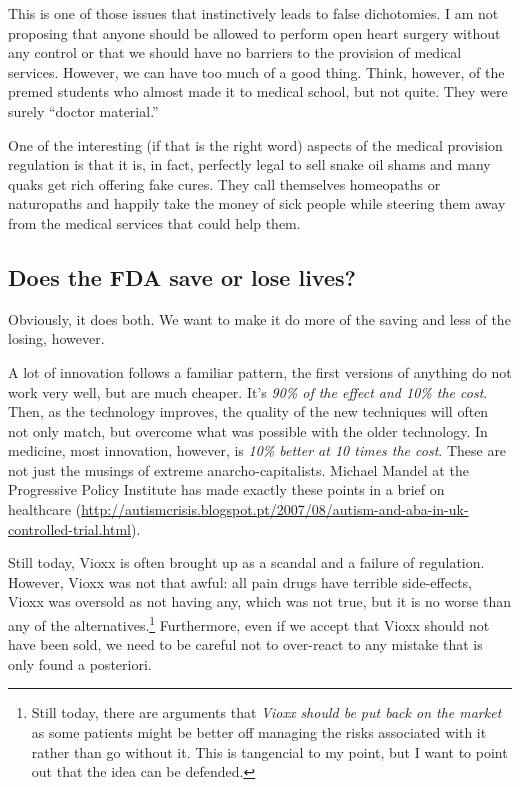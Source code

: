 This is one of those issues that instinctively leads to false dichotomies. I am
not proposing that anyone should be allowed to perform open heart surgery
without any control or that we should have no barriers to the provision of
medical services. However, we can have too much of a good thing. Think,
however, of the premed students who almost made it to medical school, but not
quite.  They were surely ``doctor material.''

One of the interesting (if that is the right word) aspects of the medical
provision regulation is that it is, in fact, perfectly legal to sell snake oil
shams and many quaks get rich offering fake cures. They call themselves
homeopaths or naturopaths and happily take the money of sick people while
steering them away from the medical services that could help them.

\subsection{Does the FDA save or lose lives?}

Obviously, it does both. We want to make it do more of the saving and less of
the losing, however.

A lot of innovation follows a familiar pattern, the first versions of anything
do not work very well, but are much cheaper. It's \emph{90\% of the effect and
10\% the cost}. Then, as the technology improves, the quality of the new
techniques will often not only match, but overcome what was possible with the
older technology. In medicine, most innovation, however, is \emph{10\% better
at 10 times the cost}. These are not just the musings of extreme
anarcho-capitalists. Michael Mandel at the Progressive Policy Institute has
made exactly these points in a brief on healthcare
(\url{http://autismcrisis.blogspot.pt/2007/08/autism-and-aba-in-uk-controlled-trial.html}).

Still today, Vioxx is often brought up as a scandal and a failure of
regulation. However, Vioxx was not that awful: all pain drugs have terrible
side-effects, Vioxx was oversold as not having any, which was not true, but it
is no worse than any of the alternatives.\footnote{Still today, there are
arguments that \emph{Vioxx should be put back on the market} as some patients
might be better off managing the risks associated with it rather than go
without it. This is tangencial to my point, but I want to point out that the
idea can be defended.} Furthermore, even if we accept that Vioxx should not
have been sold, we need to be careful not to over-react to any mistake that is
only found a posteriori.

